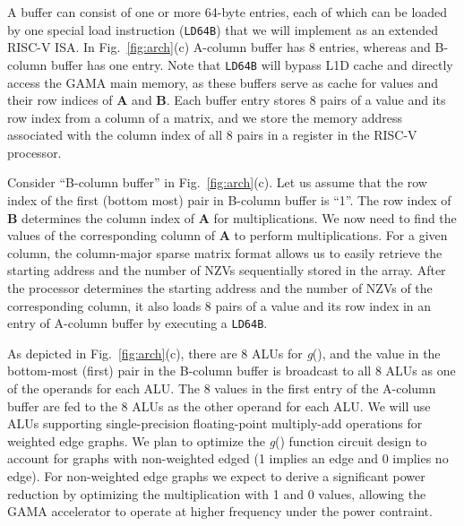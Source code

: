 A buffer can consist of one or more 64-byte entries, each of which can be loaded by one special load instruction (\texttt{LD64B}) that we will implement as an extended RISC-V ISA. 
In Fig.~\ref{fig:arch}(c) A-column buffer has 8 entries, whereas and B-column buffer has one entry.
Note that \texttt{LD64B} will bypass L1D cache and directly access the GAMA main memory, as these buffers serve as cache for values and their row indices of \textbf{A} and \textbf{B}.
Each buffer entry stores 8 pairs of a value and its row index from a column of a matrix, and
we store the memory address associated with the column index of all 8 pairs in a register in the RISC-V processor.


Consider ``B-column buffer'' in Fig.~\ref{fig:arch}(c). 
Let us assume that the row index of the first (bottom most) pair in B-column buffer is ``1''.
The row index of \textbf{B} determines the column index of \textbf{A} for multiplications. %
We now need to find the values of the corresponding column of \textbf{A} to perform multiplications.  
For a given column, the column-major sparse matrix format allows us to easily retrieve the starting address and the number of NZVs sequentially stored in the array. 
After the processor determines the starting address and the number of NZVs of the corresponding column, 
it also loads 8 pairs of a value and its row index in an entry of A-column buffer by executing a \texttt{LD64B}.


As depicted in Fig.~\ref{fig:arch}(c), there are 8 ALUs for \textit{g}(), and the value in the bottom-most (first) pair in the B-column buffer 
is broadcast to all 8 ALUs as one of the operands for each ALU.
The 8 values in the first entry of the A-column buffer are fed to the 8 ALUs as the other operand for each ALU.
We will use ALUs supporting single-precision floating-point multiply-add operations for weighted edge graphs. 
We plan to optimize the \textit{g}() function circuit design to account for graphs with non-weighted edged (1 implies an edge and 0 implies no edge). 
For non-weighted edge graphs we expect to derive a significant power reduction by optimizing the multiplication with 1 and 0 values, 
allowing the GAMA accelerator to operate at higher frequency under the power contraint.     
 
